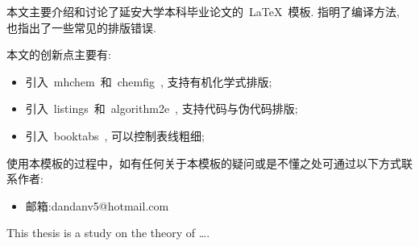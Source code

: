 \begin{cnabstract}
本文主要介绍和讨论了延安大学本科毕业论文的~\LaTeX~模板.
指明了编译方法, 也指出了一些常见的排版错误. 

本文的创新点主要有:
\begin{itemize}
	\item 引入~mhchem~和~chemfig~, 支持有机化学式排版; 
	\item 引入~listings~和~algorithm2e~, 支持代码与伪代码排版; 
	\item 引入~booktabs~, 可以控制表线粗细;
\end{itemize}

使用本模板的过程中，如有任何关于本模板的疑问或是不懂之处可通过以下方式联系作者:

\begin{itemize}
	\item 邮箱:dandanv5@hotmail.com
\end{itemize}

\end{cnabstract}
\par
\vspace*{2em}






\begin{enabstract}
This thesis is a study on the theory of \dots.

\end{enabstract}
\par
\vspace*{2em}

 \enkeywords{\LaTeX{}}
